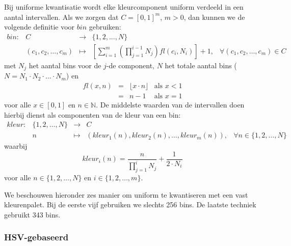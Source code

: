 Bij uniforme kwantisatie wordt elke kleurcomponent uniform verdeeld in een aantal intervallen.
Als we zorgen dat $C=[0,1]^m$, $m > 0$, dan kunnen we 
de volgende definitie voor $bin$ gebruiken:
$$
\begin{array}{lrcll}
bin: & C & \to & \{1,2,...,N\}\\[5pt]
     & (c_1,c_2,\ldots,c_m) & \mapsto & \left[ \sum_{i=1}^m \left( \prod_{j=1}^{i-1} N_j \right) \mathit{fl}(c_i, N_i) \right] + 1, & \forall (c_1,c_2,\ldots,c_m) \in C
\end{array}
$$
met $N_j$ het aantal bins voor de $j$-de component, $N$ het totale aantal bins 
($N=N_1 \cdot N_2 \cdot \ldots \cdot N_m$) en
$$
\begin{array}{rcll}
\mathit{fl}(x,n) & = & \lfloor x \cdot n \rfloor & \textrm{als } x < 1 \\
				 & = & n - 1 & \textrm{als } x = 1
\end{array}
$$
voor alle $x \in [0,1]$ en $n \in \mathbb{N}$. De middelste waarden
van de intervallen doen hierbij dienst als componenten van de kleur van een bin:
$$
\begin{array}{lrcll}
kleur: & \{1,2,\ldots,N\} & \to & C \\
	   & n & \mapsto & (kleur_1(n), kleur_2(n), \dots, kleur_m(n)), & \forall n \in \{1,2,\ldots,N\} 
\end{array}
$$
waarbij
$$
kleur_i(n) = \frac{n}{\prod_{j=1}^i N_j} + \frac{1}{2 \cdot N_i}
$$
voor alle $n \in \{1,2,\ldots,N\}$ en $i \in \{1,2,\ldots,m\}$.

We beschouwen hieronder zes manier om uniform te kwantiseren met een vast kleurenpalet.  
Bij de eerste vijf gebruiken 
we slechts 256 bins. De laatste techniek gebruikt 343 bins.

\subsubsection{HSV-gebaseerd}

